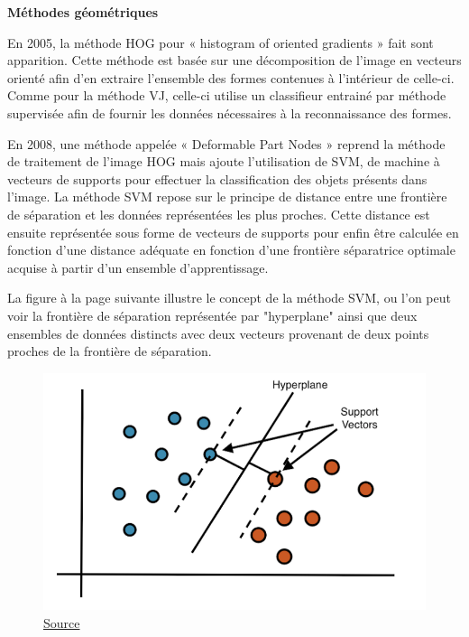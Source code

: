 \documentclass[a4paper,12pt]{article} %
\begin{document}
\textbf{Méthodes géométriques }\newline
\par
En 2005, la méthode HOG pour « histogram of oriented gradients » fait sont apparition. Cette méthode est basée sur une décomposition de l’image en vecteurs orienté afin d’en extraire l’ensemble des formes contenues à l’intérieur de celle-ci. Comme pour la méthode VJ, celle-ci utilise un classifieur entrainé par méthode supervisée afin de fournir les données nécessaires à la reconnaissance des formes. \newline
\par
En 2008, une méthode appelée « Deformable Part Nodes » reprend la méthode de traitement de l’image HOG mais ajoute l’utilisation de SVM, de machine à vecteurs de supports pour effectuer la classification des objets présents dans l’image. La méthode SVM repose sur le principe de distance entre une frontière de séparation et les données représentées les plus proches. Cette distance est ensuite représentée sous forme de vecteurs de supports pour enfin être calculée en fonction d’une distance adéquate en fonction d’une frontière séparatrice optimale acquise à partir d’un ensemble d’apprentissage.
\newline
\par
La figure à la page suivante illustre le concept de la méthode SVM, ou l'on peut voir la frontière de séparation représentée par "hyperplane" ainsi que deux ensembles de données distincts avec deux vecteurs provenant de deux points proches de la frontière de séparation. 
\begin{figure}[h] %
  \centering %
  \includegraphics[scale=0.40]{vectors.png} %
  \caption{\href{ https://ichi.pro/fr/explication-de-la-machine-vectorielle-de-support-svm-97743104690915}{Source} }
\end{figure}
\newline
\end{document}
